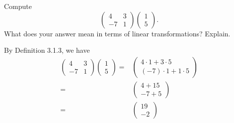 \documentclass[12pt]{article}
\newenvironment{problem}[2][Problem]
{
	\begin{trivlist} 
		\item[\hskip \labelsep {\bfseries #1 #2:}]
	}
{
	\end{trivlist}
	}
\newenvironment{solution}[1][Solution]
{
	\begin{trivlist} 
		\item[\hskip \labelsep {\itshape #1:}]
	}
	{
	\end{trivlist}
}
\begin{document}
\newpage
\begin{problem}{2}
Compute
\[
\begin{pmatrix}4 & 3 \\ -7 & 1\end{pmatrix} \begin{pmatrix}1\\5\end{pmatrix} \text{.}
\]
What does your answer mean in terms of linear transformations? Explain.
\noindent
\newline
\newline

\begin{solution}
By Definition 3.1.3, we have
\begin{align*}
\begin{pmatrix}4 & 3 \\ -7 & 1\end{pmatrix} \begin{pmatrix}1\\5\end{pmatrix} =& \begin{pmatrix}4 \cdot 1 + 3\cdot 5 \\ (-7) \cdot 1 +1 \cdot 5 \end{pmatrix}\\
=& \begin{pmatrix}4  + 15 \\ -7 + 5  \end{pmatrix}\\
=& \begin{pmatrix}19\\ -2\end{pmatrix}
\end{align*}

\end{solution}
\end{problem}
\end{document}
